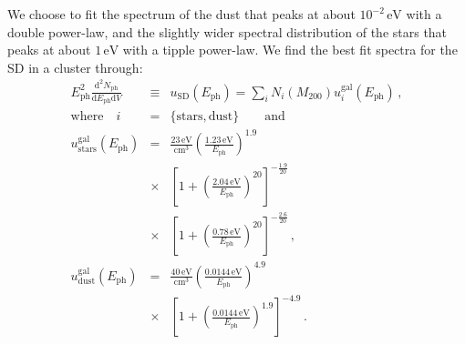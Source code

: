 \documentclass[10pt,aps,pra,reprint,amsmath,amsfonts,amssymb,showpacs]{revtex4-1}
\newcommand{\rmn}{\mathrm}
\newcommand{\ph}{\rmn{ph}}
\newcommand{\eph}{E_\ph}
\newcommand{\gal}{\rmn{gal}}
\newcommand{\sd}{\rmn{SD}}
\newcommand{\stars}{\rmn{stars}}
\newcommand{\dust}{\rmn{dust}}
\newcommand{\lx}{L_\rmn{X}}
\newcommand{\ev}{\rmn{eV}}
\newcommand{\dd}{\rmn{d}}
\newcommand{\mvir}{M_{200}}
\begin{document}
We choose to fit the spectrum of the dust that peaks at about
$10^{-2}\,\ev$ with a double power-law, and the slightly wider
spectral distribution of the stars that peaks at about $1\,\ev$ with a
tipple power-law. We find the best fit spectra for the SD in a
cluster through:
\begin{eqnarray}
  \eph^2\frac{\dd^2 N_\ph}{\dd \eph \dd V}
  &\equiv& u_\sd(\eph) =  \sum_i N_i(\mvir) u_i^\gal(\eph)\,,\nonumber \\ 
\rmn{where}\quad i&=&\{\rmn{stars,dust}\} \qquad \rmn{and}\\ 
  u_\stars^\gal(\eph) &=& \frac{23\,\rmn{eV}}{\rmn{cm}^3} 
  \left(\frac{1.23\,\rmn{eV}}{\eph}\right)^{1.9} \nonumber \\
  &\times&\left[1+\left(\frac{2.04\,\rmn{eV}}{\eph}\right)^{20}\right]
  ^{-\frac{1.9}{20}}\nonumber \\
  &\times& \left[1+\left(\frac{0.78\,\rmn{eV}}{\eph}\right)^{20}\right]^{-\frac{2.6}{20}}\,, \\
  u_\dust^\gal(\eph) &=& 
  \frac{40\,\rmn{eV}}{\rmn{cm}^3} 
  \left(\frac{0.0144\,\rmn{eV}}{\eph}\right)^{4.9}\nonumber \\
  &\times& \left[1+\left(\frac{0.0144\,\rmn{eV}}{\eph}\right)^{1.9}\right]^{-4.9}\,.
\end{eqnarray}
\end{document}

